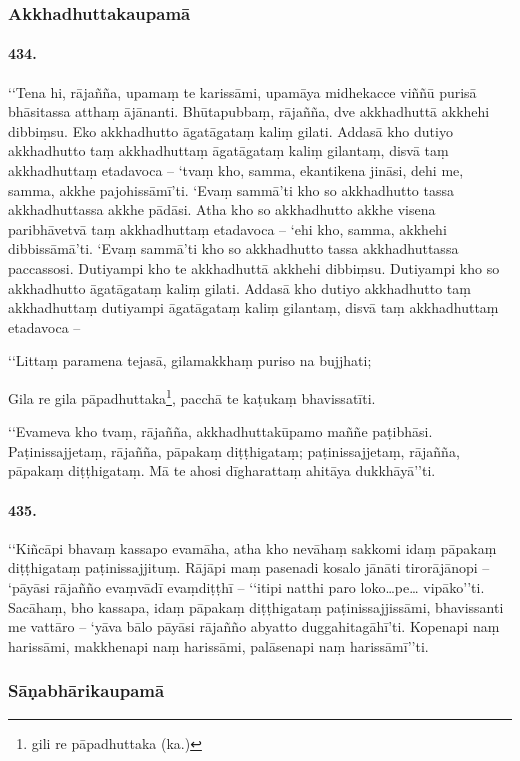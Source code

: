 \subsubsection{Akkhadhuttakaupamā}

\paragraph{434.} ‘‘Tena hi, rājañña, upamaṃ te karissāmi, upamāya midhekacce viññū purisā bhāsitassa atthaṃ ājānanti. Bhūtapubbaṃ, rājañña, dve akkhadhuttā akkhehi dibbiṃsu. Eko akkhadhutto āgatāgataṃ kaliṃ gilati. Addasā kho dutiyo akkhadhutto taṃ akkhadhuttaṃ āgatāgataṃ kaliṃ gilantaṃ, disvā taṃ akkhadhuttaṃ etadavoca – ‘tvaṃ kho, samma, ekantikena jināsi, dehi me, samma, akkhe pajohissāmī’ti. ‘Evaṃ sammā’ti kho so akkhadhutto tassa akkhadhuttassa akkhe pādāsi. Atha kho so akkhadhutto akkhe visena paribhāvetvā taṃ akkhadhuttaṃ etadavoca – ‘ehi kho, samma, akkhehi dibbissāmā’ti. ‘Evaṃ sammā’ti kho so akkhadhutto tassa akkhadhuttassa paccassosi. Dutiyampi kho te akkhadhuttā akkhehi dibbiṃsu. Dutiyampi kho so akkhadhutto āgatāgataṃ kaliṃ gilati. Addasā kho dutiyo akkhadhutto taṃ akkhadhuttaṃ dutiyampi āgatāgataṃ kaliṃ gilantaṃ, disvā taṃ akkhadhuttaṃ etadavoca –

‘‘Littaṃ paramena tejasā, gilamakkhaṃ puriso na bujjhati;

Gila re gila pāpadhuttaka\footnote{gili re pāpadhuttaka (ka.)}, pacchā te kaṭukaṃ bhavissatīti.

‘‘Evameva kho tvaṃ, rājañña, akkhadhuttakūpamo maññe paṭibhāsi. Paṭinissajjetaṃ, rājañña, pāpakaṃ diṭṭhigataṃ; paṭinissajjetaṃ, rājañña, pāpakaṃ diṭṭhigataṃ. Mā te ahosi dīgharattaṃ ahitāya dukkhāyā’’ti.

\paragraph{435.} ‘‘Kiñcāpi bhavaṃ kassapo evamāha, atha kho nevāhaṃ sakkomi idaṃ pāpakaṃ diṭṭhigataṃ paṭinissajjituṃ. Rājāpi maṃ pasenadi kosalo jānāti tirorājānopi – ‘pāyāsi rājañño evaṃvādī evaṃdiṭṭhī – ‘‘itipi natthi paro loko…pe… vipāko’’ti. Sacāhaṃ, bho kassapa, idaṃ pāpakaṃ diṭṭhigataṃ paṭinissajjissāmi, bhavissanti me vattāro – ‘yāva bālo pāyāsi rājañño abyatto duggahitagāhī’ti. Kopenapi naṃ harissāmi, makkhenapi naṃ harissāmi, palāsenapi naṃ harissāmī’’ti.

\subsubsection{Sāṇabhārikaupamā}

